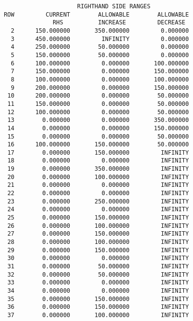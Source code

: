 \begin{verbatim}
                           RIGHTHAND SIDE RANGES
      ROW         CURRENT        ALLOWABLE        ALLOWABLE
                    RHS          INCREASE         DECREASE
        2      150.000000       350.000000         0.000000
        3      450.000000         INFINITY         0.000000
        4      250.000000        50.000000         0.000000
        5      150.000000        50.000000         0.000000
        6      100.000000         0.000000       100.000000
        7      150.000000         0.000000       150.000000
        8      100.000000         0.000000       100.000000
        9      200.000000         0.000000       150.000000
       10      200.000000         0.000000        50.000000
       11      150.000000         0.000000        50.000000
       12      100.000000         0.000000        50.000000
       13        0.000000         0.000000       350.000000
       14        0.000000         0.000000       150.000000
       15        0.000000         0.000000        50.000000
       16      100.000000       150.000000        50.000000
       17        0.000000       150.000000         INFINITY
       18        0.000000         0.000000         INFINITY
       19        0.000000       350.000000         INFINITY
       20        0.000000       100.000000         INFINITY
       21        0.000000         0.000000         INFINITY
       22        0.000000         0.000000         INFINITY
       23        0.000000       250.000000         INFINITY
       24        0.000000         0.000000         INFINITY
       25        0.000000       150.000000         INFINITY
       26        0.000000       100.000000         INFINITY
       27        0.000000       150.000000         INFINITY
       28        0.000000       100.000000         INFINITY
       29        0.000000       150.000000         INFINITY
       30        0.000000         0.000000         INFINITY
       31        0.000000        50.000000         INFINITY
       32        0.000000        50.000000         INFINITY
       33        0.000000         0.000000         INFINITY
       34        0.000000         0.000000         INFINITY
       35        0.000000       150.000000         INFINITY
       36        0.000000       150.000000         INFINITY
       37        0.000000       100.000000         INFINITY

\end{verbatim}


